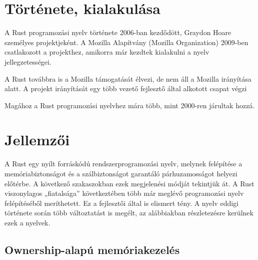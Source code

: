 
\section{Története, kialakulása}

A Rust programozási nyelv története 2006-ban kezdődött, Graydon Hoare személyes projektjeként. A Mozilla Alapítvány (Mozilla Organization) 2009-ben csatlakozott a projekthez, amikorra már kezdtek kialakulni a nyelv jellegzetességei.


A Rust továbbra is a Mozilla támogatását élvezi, de nem áll a Mozilla irányítása alatt. A projekt irányítását egy több vezető fejlesztő által alkotott csapat végzi


Magához a Rust programozási nyelvhez mára több, mint 2000-ren járultak hozzá.


\section{Jellemzői}

A Rust egy nyílt forráskódú rendszerprogramozási nyelv, melynek felépítése a memóriabiztonságot és a szálbiztonságot garantáló párhuzamosságot helyezi előtérbe. A következő szakaszokban ezek megjelenési módját tekintjük át. A Rust viszonylagos „fiatalsága” következtében több már meglévő programozási nyelv felépítéséből meríthetett. Ez a fejlesztői által is elismert tény. %
A nyelv eddigi története során több változtatást is megélt, az alábbiakban részletezésre kerülnek ezek a nyelvek.
 
\subsection{Ownership-alapú memóriakezelés}

